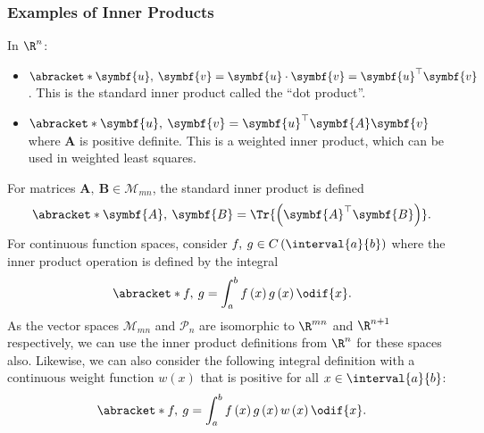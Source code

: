\documentclass{article}
\begin{document}
\subsubsection{Examples of Inner Products}
In \(\R^n\):
\begin{itemize}
    \item \(\abracket*{\symbf{u},\: \symbf{v}} = \symbf{u} \cdot \symbf{v} = \symbf{u}^\top \symbf{v}\). This is the standard inner product called the ``dot product''.
    \item \(\abracket*{\symbf{u},\: \symbf{v}} = \symbf{u}^\top \symbf{A} \symbf{v}\) where \(\symbf{A}\) is positive definite. This is a weighted inner product, which can be used in weighted least squares.
\end{itemize}
For matrices \(\symbf{A},\: \symbf{B} \in \mathscr{M}_{mn}\), the standard inner product is defined
\begin{equation*}
    \abracket*{\symbf{A},\: \symbf{B}} = \Tr{\left( \symbf{A}^\top \symbf{B} \right)}.
\end{equation*}
For continuous function spaces, consider \(f,\: g \in C\left( \interval{a}{b} \right)\) where
the inner product operation is defined by the integral
\begin{equation*}
    \abracket*{f,\: g} = \int_a^b f\left( x \right) g\left( x \right) \odif{x}.
\end{equation*}
As the vector spaces \(\mathscr{M}_{mn}\) and \(\mathscr{P}_n\) are
isomorphic to \(\R^{mn}\) and \(\R^{n + 1}\) respectively,
we can use the inner product definitions from \(\R^n\) for these spaces also.
Likewise, we can also consider the following integral definition with a
continuous weight function \(w\left( x \right)\) that is positive for
all \(x \in \interval{a}{b}\):
\begin{equation*}
    \abracket*{f,\: g} = \int_a^b f\left( x \right) g\left( x \right) w\left( x \right) \odif{x}.
\end{equation*}
\end{document}
